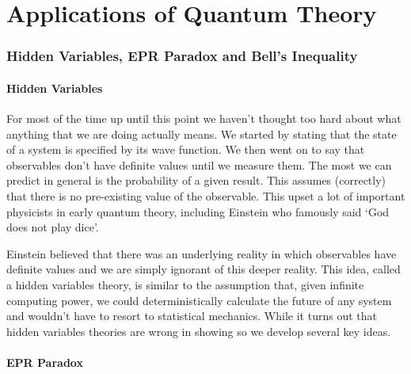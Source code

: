     \part{Applications of Quantum Theory}
    \section{Hidden Variables, EPR Paradox and Bell's Inequality}
    \subsection{Hidden Variables}
    For most of the time up until this point we haven't thought too hard about what anything that we are doing actually means.
    We started by stating that the state of a system is specified by its wave function.
    We then went on to say that observables don't have definite values until we measure them.
    The most we can predict in general is the probability of a given result.
    This assumes (correctly) that there is no pre-existing value of the observable.
    This upset a lot of important physicists in early quantum theory, including Einstein who famously said `God does not play dice'.
    
    Einstein believed that there was an underlying reality in which observables have definite values and we are simply ignorant of this deeper reality.
    This idea, called a hidden variables theory, is similar to the assumption that, given infinite computing power, we could deterministically calculate the future of any system and wouldn't have to resort to statistical mechanics.
    While it turns out that hidden variables theories are wrong in showing so we develop several key ideas.
    
    \subsection{EPR Paradox}
